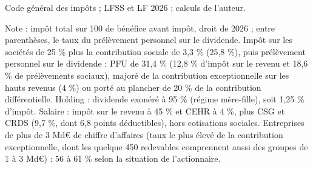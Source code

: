 Code général des impôts ; LFSS et LF 2026 ; calculs de l'auteur.\par Note : impôt total sur 100 de bénéfice avant impôt, droit de 2026 ; entre parenthèses, le taux du prélèvement personnel sur le dividende. Impôt sur les sociétés de 25 \% plus la contribution sociale de 3,3 \% (25,8 \%), puis prélèvement personnel sur le dividende : PFU de 31,4 \% (12,8 \% d'impôt sur le revenu et 18,6 \% de prélèvements sociaux), majoré de la contribution exceptionnelle sur les hauts revenus (4 \%) ou porté au plancher de 20 \% de la contribution différentielle. Holding : dividende exonéré à 95 \% (régime mère-fille), soit 1,25 \% d'impôt. Salaire : impôt sur le revenu à 45 \% et CEHR à 4 \%, plus CSG et CRDS (9,7 \%, dont 6,8 points déductibles), hors cotisations sociales. Entreprises de plus de 3 Md\euro{} de chiffre d'affaires (taux le plus élevé de la contribution exceptionnelle, dont les quelque 450 redevables comprennent aussi des groupes de 1 à 3 Md\euro{}) : 56 à 61 \% selon la situation de l'actionnaire.
